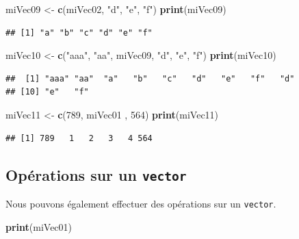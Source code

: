 \documentclass[twoside,symmetric]{book}
\newenvironment{Shaded}{}{}
\newcommand{\DecValTok}[1]{#1}
\newcommand{\KeywordTok}[1]{\textbf{#1}}
\newcommand{\NormalTok}[1]{#1}
\newcommand{\StringTok}[1]{#1}
\begin{document}
\begin{Shaded}
\begin{Highlighting}[]
\NormalTok{miVec09 <-}\StringTok{ }\KeywordTok{c}\NormalTok{(miVec02, }\StringTok{"d"}\NormalTok{, }\StringTok{"e"}\NormalTok{, }\StringTok{"f"}\NormalTok{)}
\KeywordTok{print}\NormalTok{(miVec09)}
\end{Highlighting}
\end{Shaded}

\begin{verbatim}
## [1] "a" "b" "c" "d" "e" "f"
\end{verbatim}

\begin{Shaded}
\begin{Highlighting}[]
\NormalTok{miVec10 <-}\StringTok{ }\KeywordTok{c}\NormalTok{(}\StringTok{"aaa"}\NormalTok{, }\StringTok{"aa"}\NormalTok{, miVec09, }\StringTok{"d"}\NormalTok{, }\StringTok{"e"}\NormalTok{, }\StringTok{"f"}\NormalTok{)}
\KeywordTok{print}\NormalTok{(miVec10)}
\end{Highlighting}
\end{Shaded}

\begin{verbatim}
##  [1] "aaa" "aa"  "a"   "b"   "c"   "d"   "e"   "f"   "d"  
## [10] "e"   "f"
\end{verbatim}

\begin{Shaded}
\begin{Highlighting}[]
\NormalTok{miVec11 <-}\StringTok{ }\KeywordTok{c}\NormalTok{(}\DecValTok{789}\NormalTok{, miVec01 , }\DecValTok{564}\NormalTok{)}
\KeywordTok{print}\NormalTok{(miVec11)}
\end{Highlighting}
\end{Shaded}

\begin{verbatim}
## [1] 789   1   2   3   4 564
\end{verbatim}

\hypertarget{opuxe9rations-sur-un-vector}{%
\subsection{\texorpdfstring{Opérations sur un \texttt{vector}}{Opérations sur un vector}}\label{opuxe9rations-sur-un-vector}}

Nous pouvons également effectuer des opérations sur un \texttt{vector}.

\begin{Shaded}
\begin{Highlighting}[]
\KeywordTok{print}\NormalTok{(miVec01)}
\end{Highlighting}
\end{Shaded}
\end{document}
